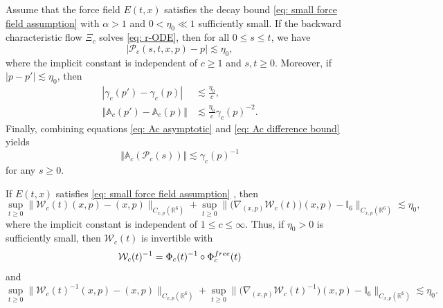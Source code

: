 \documentclass[10pt,a4paper]{amsart}
\begin{document}
\begin{lemma}
\label{lemma: perturbed momentum}
Assume that the force field $E(t,x)$ satisfies the decay bound \eqref{eq: small force field assumption} with $\alpha > 1$ and $0< \eta_0 \ll 1$ sufficiently small. If the backward characteristic flow $\Xi_c$ solves \eqref{eq: r-ODE}, then for all $0\leq s\leq t$,
we have
\begin{equation}\label{eq: bound for Pc}
\left | \mathcal{P}_c(s,t,x,p)- p \right | \lesssim \eta_0,
\end{equation}
where the implicit constant is independent of $c \geq 1$ and $s,t \geq 0$.
Moreover, if $|p-p'|\lesssim\eta_0$, then
\begin{align}
\left |\gamma_c(p') - \gamma_c(p) \right | & \lesssim \frac{\eta_0}{c},\label{eq: gamma c difference bound}\\
\left \Vert \mathbb{A}_c(p') - \mathbb{A}_c(p) \right \Vert & \lesssim \frac{\eta_0}{c}\gamma_c(p)^{-2}.\label{eq: Ac difference bound}
\end{align}
Finally, combining equations \eqref{eq: Ac asymptotic} and \eqref{eq: Ac difference bound} yields
\begin{equation}\label{A bound}
\Vert \mathbb{A}_c(\mathcal{P}_c(s)) \Vert \lesssim \gamma_c(p)^{-1}
\end{equation}
for any $ s \geq 0.$
\end{lemma}

\begin{lemma}
\label{lemma:  the wave operator, almost identity}
If $E(t,x)$ satisfies \eqref{eq: small force field assumption} , then
\begin{equation}\label{eq: approx identity, finite-time wave operator}
\sup_{t\geq 0}\Big\|\mathcal{W}_c(t)(x,p)-(x,p)\Big\|_{C_{x,p}(\mathbb{R}^6)}+\sup_{t\geq 0}\Big\|\Big(\nabla_{(x,p)}\mathcal{W}_c(t)\Big)(x,p)-\mathbb{I}_6\Big\|_{C_{x,p}(\mathbb{R}^6)}\lesssim\eta_0,
\end{equation}
where the implicit constant is independent of $1 \leq c \leq \infty$. Thus, if $\eta_0>0$ is sufficiently small, then $\mathcal{W}_c(t)$ is invertible with 
$$\mathcal{W}_c(t)^{-1} = \Phi_c(t)^{-1} \circ \Phi_c^{\textup{free}}(t)$$
and
\begin{equation}\label{eq: approx identity, inverse finite-time wave operator}
\sup_{t\geq 0}\Big\|\mathcal{W}_c(t)^{-1}(x,p)-(x,p)\Big\|_{C_{x,p}(\mathbb{R}^6)}+\sup_{t\geq 0}\Big\|\Big(\nabla_{(x,p)}\mathcal{W}_c(t)^{-1}\Big)(x,p)-\mathbb{I}_6\Big\|_{C_{x,p}(\mathbb{R}^6)}\lesssim\eta_0.
\end{equation}
\end{lemma} 
\end{document}
